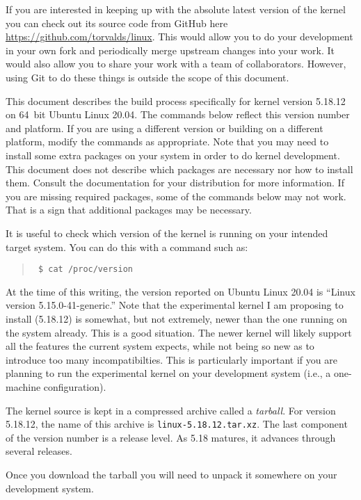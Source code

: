 \documentclass{article}
\newcommand{\filename}[1]{\texttt{#1}}
\newcommand{\newterm}[1]{\textit{#1}}
\newenvironment{commands}
  {\begin{quote} \tt}
  {\end{quote}}
\begin{document}
If you are interested in keeping up with the absolute latest version of the kernel you can check
out its source code from GitHub here \url{https://github.com/torvalds/linux}. This would allow
you to do your development in your own fork and periodically merge upstream changes into your
work. It would also allow you to share your work with a team of collaborators. However, using
Git to do these things is outside the scope of this document.

This document describes the build process specifically for kernel version 5.18.12 on 64~bit
Ubuntu Linux 20.04. The commands below reflect this version number and platform. If you are
using a different version or building on a different platform, modify the commands as
appropriate. Note that you may need to install some extra packages on your system in order to do
kernel development. This document does not describe which packages are necessary nor how to
install them. Consult the documentation for your distribution for more information. If you are
missing required packages, some of the commands below may not work. That is a sign that
additional packages may be necessary.

It is useful to check which version of the kernel is running on your intended target system. You
can do this with a command such as:

\begin{commands}
  \$ cat /proc/version
\end{commands}

At the time of this writing, the version reported on Ubuntu Linux 20.04 is ``Linux version
5.15.0-41-generic.'' Note that the experimental kernel I am proposing to install (5.18.12) is
somewhat, but not extremely, newer than the one running on the system already. This is a good
situation. The newer kernel will likely support all the features the current system expects,
while not being so new as to introduce too many incompatibilties. This is particularly important
if you are planning to run the experimental kernel on your development system (i.e., a
one-machine configuration).

The kernel source is kept in a compressed archive called a \newterm{tarball}. For version
5.18.12, the name of this archive is \filename{linux-5.18.12.tar.xz}. The last component of the
version number is a release level. As 5.18 matures, it advances through several releases.

Once you download the tarball you will need to unpack it somewhere on your development system.
\end{document}
